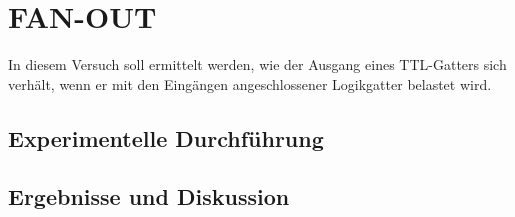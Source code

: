 \section{FAN-OUT}
In diesem Versuch soll ermittelt werden, wie der Ausgang eines TTL-Gatters sich verh\"alt, wenn er mit den Eing\"angen angeschlossener Logikgatter belastet wird.
\subsection{Experimentelle Durchf\"uhrung}
\subsection{Ergebnisse und Diskussion}